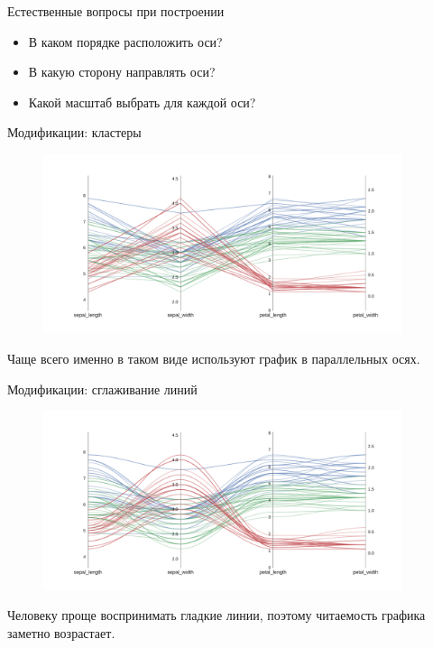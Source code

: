 \documentclass[fleqn, xcolor=x11names]{beamer}
\begin{document}
\begin{frame}{Естественные вопросы при построении}
    \begin{itemize}
        \item В каком порядке расположить оси?
        \item В какую сторону направлять оси?
        \item Какой масштаб выбрать для каждой оси?
    \end{itemize}
\end{frame}


\begin{frame}{Модификации: кластеры}
    \begin{figure}[htb]
        \centering
        \includegraphics[width=10.5cm]{color_pc.pdf}
    \end{figure}
    Чаще всего именно в таком виде используют график в параллельных осях.
\end{frame}

\begin{frame}{Модификации: сглаживание линий}
    \begin{figure}[htb]
        \centering
        \includegraphics[width=10.5cm]{smooth_pc.pdf}
    \end{figure}
    Человеку проще воспринимать гладкие линии, поэтому читаемость графика заметно возрастает.
\end{frame}
\end{document}
